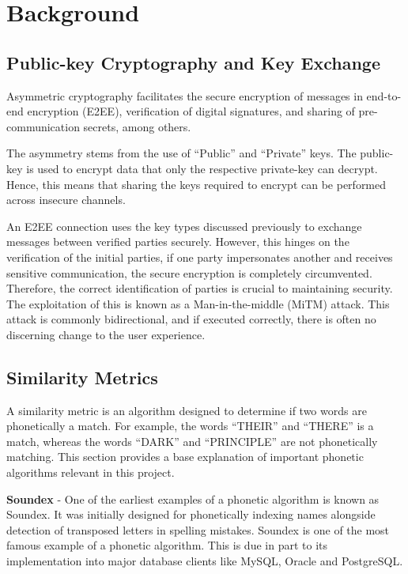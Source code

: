 \section{Background}

\subsection{Public-key Cryptography and Key Exchange}
Asymmetric cryptography facilitates the secure encryption of messages
in end-to-end encryption (E2EE), verification of digital signatures, and
sharing of pre-communication secrets, among others.

The asymmetry stems from the use of ``Public'' and ``Private'' keys. The
public-key is used to encrypt data that only the respective private-key
can decrypt. Hence, this means that sharing the keys required to encrypt
can be performed across insecure channels.

An E2EE connection uses the key types discussed previously to exchange messages between verified parties securely. However, this hinges
on the verification of the initial parties, if one party impersonates another and receives sensitive communication, the secure encryption is
completely circumvented. Therefore, the correct identification of parties is crucial to maintaining security. The exploitation of this is known as a Man-in-the-middle (MiTM) attack. This attack is commonly bidirectional, and if executed correctly, there is often no discerning change to the user experience.

\subsection{Similarity Metrics}
\label{sec:similarity_metric}
A similarity metric is an algorithm designed to determine if two words are phonetically a match. For example, the words ``THEIR'' and ``THERE'' is a match, whereas the words ``DARK'' and ``PRINCIPLE'' are not phonetically matching. This section provides a base explanation of important phonetic algorithms relevant in this project.

\textbf{Soundex} - One of the earliest examples of a phonetic algorithm is known as Soundex. It was initially designed for phonetically indexing names alongside detection of transposed letters in spelling mistakes.  Soundex is one of the most famous example of a phonetic algorithm. This is due in part to its implementation into major database clients like MySQL\cite{mysql_soundex}, Oracle\cite{moved_2005} and PostgreSQL\cite{postgresql}.

